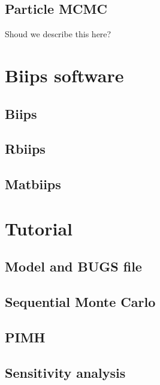 \documentclass[article,shortnames]{jss}
\begin{document}
\subsection{Particle MCMC}
Shoud we describe this here?

\section{Biips software}
\label{sec:biips}
\subsection{Biips}
\subsection{Rbiips}
\subsection{Matbiips}

\section{Tutorial}
\label{sec:examples}

\subsection{Model and BUGS file}


\subsection{Sequential Monte Carlo}



\subsection{PIMH}

\subsection{Sensitivity analysis}
\end{document}
